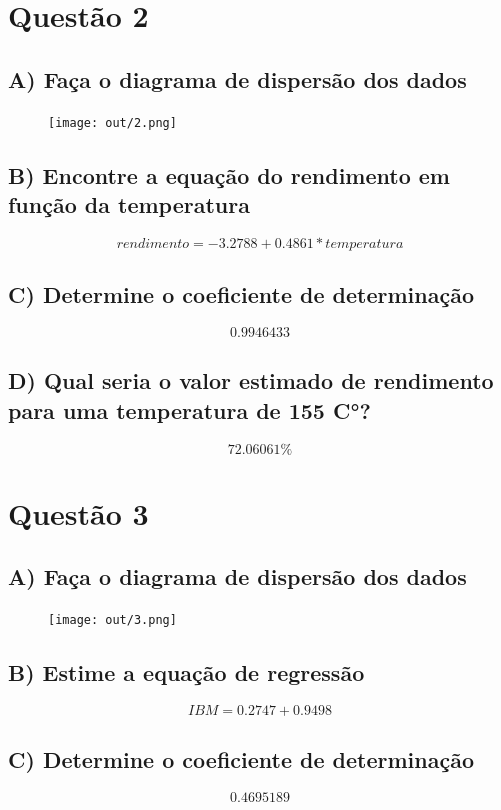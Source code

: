 \documentclass[17pt]{extarticle}
\begin{document}
\section{Questão 2}
\subsection{A) Faça o diagrama de dispersão dos dados}
\begin{figure}[H]
    \centering
    \texttt{[image: out/2.png]}
    \label{fig:my_label}
\end{figure}

\subsection{B) Encontre a equação do rendimento em função da temperatura}
\[ rendimento = -3.2788 + 0.4861 * temperatura \]

\subsection{C) Determine o coeficiente de determinação}
\[ 0.9946433 \]

\subsection{D) Qual seria o valor estimado de rendimento para uma temperatura de 155 C°?}
\[ 72.06061 \% \]

\section{Questão 3}
\subsection{A) Faça o diagrama de dispersão dos dados}
\begin{figure}[H]
    \centering
    \texttt{[image: out/3.png]}
    \label{fig:my_label}
\end{figure}

\subsection{B) Estime a equação de regressão}
\[ IBM = 0.2747 + 0.9498 \]

\subsection{C) Determine o coeficiente de determinação}
\[ 0.4695189 \]
\end{document}
